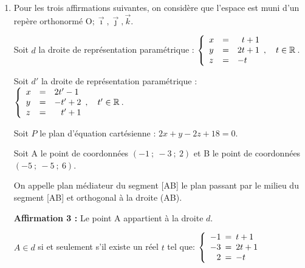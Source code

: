 \documentclass[10pt]{article}
\providecommand{\R}{\mathbb{R}}
\providecommand{\ds}{\displaystyle}
\providecommand{\Oijk}{\(\mathrm{O};\vec{\imath},\vec{\jmath},\vec{k}\)}
\begin{document}
\begin{enumerate}

\hfill\textbf{Affirmation 2 vraie}

		\item Pour les trois affirmations suivantes, on considère que l'espace est muni d'un repère orthonormé \Oijk.

\medskip

Soit $d$ la droite de représentation paramétrique : \quad 
$\left\{\begin{array}{l c l}
x&=&\phantom{2}t+1 \\
y&=&2 t+1 \\
z&=&-t
\end{array},\quad t \in \R\right.$.

		Soit $d'$ la droite de représentation paramétrique : \quad $\left\{\begin{array}{l c l}
x&=&2t'-1 \\
y&=&-t'+2 \\
z&=&\phantom{-}t'+1
\end{array},\quad t' \in \R\right.$.

\medskip

Soit $P$ le plan d'équation cartésienne : $2 x+y-2 z+18=0$.

Soit A le point de coordonnées $(-1 ~;~-3 ~;~ 2)$ et B le point de coordonnées $(-5 ~;~-5~;~6)$.

On appelle plan médiateur du segment [AB] le plan passant par le milieu du segment [AB] et orthogonal à la droite (AB).

\medskip

\textbf{Affirmation 3 :} Le point A appartient à la droite $d$.

$A\in d$ si et seulement s'il existe un réel $t$ tel que:
$\left\{
\begin{array}{r !{=} l}
-1 &t+1 \\
-3 &2 t+1 \\
2 &-t
\end{array}
\right.$


\end{enumerate}
\end{document}
